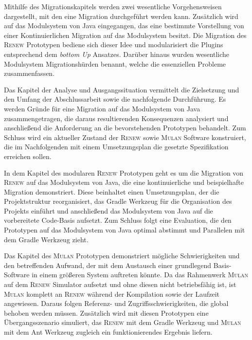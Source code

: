 Mithilfe des Migrationskapitels werden zwei wesentliche Vorgehensweisen dargestellt, mit den eine Migration durchgeführt werden kann. Zusätzlich wird auf das Modulsystem von Java eingegangen, das eine bestimmte Vorstellung von einer Kontinuierlichen Migration auf das Modulsystem besitzt. \newline
Die Migration des \textsc{Renew} Prototypen bediene sich dieser Idee und modularisiert die Plugins entsprechend dem \textit{bottom Up} Ansatzes. Darüber hinaus wurden wesentliche Modulsystem Migrationshürden benannt, welche die essenziellen Probleme zusammenfassen. \bigbreak

Das Kapitel der Analyse und Ausgangssituation vermittelt die Zielsetzung und den Umfang der Abschlussarbeit sowie die nachfolgende Durchführung. Es werden Gründe für eine Migration auf das Modulsystem von Java zusammengetragen, die daraus resultierenden Konsequenzen analysiert und anschließend die Anforderung an die bevorstehenden Prototypen behandelt. Zum Schluss wird ein aktueller Zustand der \textsc{Renew} sowie \textsc{Mulan} Software konstruiert, die im Nachfolgenden mit einem Umsetzungsplan die gesetzte Spezifikation erreichen sollen.\bigbreak

In dem Kapitel des modularen \textsc{Renew} Prototypen geht es um die Migration von \textsc{Renew} auf das Modulsystem von Java, die eine kontinuierliche und beispielhafte Migration demonstriert. Diese beinhaltet einen Umsetzungsplan, der die Projektstruktur reorganisiert, das Gradle Werkzeug für die Organisation des Projekts einführt und anschließend das Modulsystem von Java auf die vorbereitete Code-Basis aufsetzt. Zum Schluss folgt eine Evaluation, die den Prototypen auf das Modulsystem von Java optimal abstimmt und Parallelen mit dem Gradle Werkzeug zieht.\bigbreak

 Das Kapitel des \textsc{Mulan} Prototypen demonstriert mögliche Schwierigkeiten und den betreffenden Aufwand, der mit dem Austausch einer grundlegend Basis-Software in einem größeren System auftreten könnte. Da das Rahmenwerk \textsc{Mulan} auf dem \textsc{Renew} Simulator aufsetzt und ohne diesen nicht betriebsfähig ist, ist \textsc{Mulan} komplett an \textsc{Renew} während der Kompilation sowie der Laufzeit angewiesen. Daraus folgen Referenz- und Zugriffsschwierigkeiten, die global behoben werden müssen. Zusätzlich wird mit diesen Prototypen eine Übergangsszenario simuliert, das \textsc{Renew} mit dem Gradle Werkzeug und \textsc{Mulan} mit dem Ant Werkzeug zugleich ein funktionierendes Ergebnis liefern. \bigbreak

